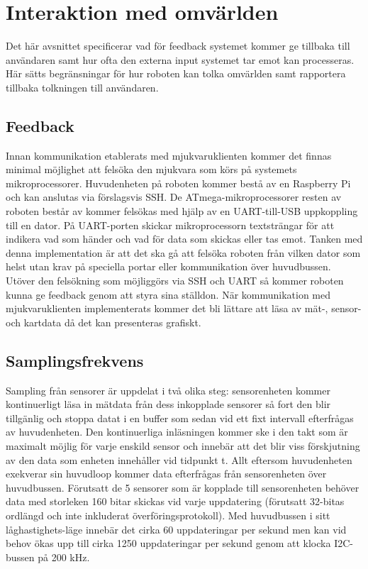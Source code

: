 \documentclass{article}
\begin{document}
\clearpage

\section{Interaktion med omvärlden}
Det här avsnittet specificerar vad för feedback systemet kommer ge tillbaka till användaren samt hur ofta den externa input systemet tar emot kan processeras. Här sätts begränsningar för hur roboten kan tolka omvärlden samt rapportera tillbaka tolkningen till användaren.

\subsection{Feedback}
Innan kommunikation etablerats med mjukvaruklienten kommer det finnas minimal möjlighet att felsöka den mjukvara som körs på systemets mikroprocessorer. Huvudenheten på roboten kommer bestå av en Raspberry Pi och kan anslutas via förslagsvis SSH. De ATmega-mikroprocessorer resten av roboten består av kommer felsökas med hjälp av en UART-till-USB uppkoppling till en dator. På UART-porten skickar mikroprocessorn textsträngar för att indikera vad som händer och vad för data som skickas eller tas emot. Tanken med denna implementation är att det ska gå att felsöka roboten från vilken dator som helst utan krav på speciella portar eller kommunikation över huvudbussen.
\newline\newline
Utöver den felsökning som möjliggörs via SSH och UART så kommer roboten kunna ge feedback genom att styra sina ställdon. När kommunikation med mjukvaruklienten implementerats kommer det bli lättare att läsa av mät-, sensor- och kartdata då det kan presenteras grafiskt.

\subsection{Samplingsfrekvens}
\label{sec:samplingsfrekvens}
Sampling från sensorer är uppdelat i två olika steg: sensorenheten kommer kontinuerligt läsa in mätdata från dess inkopplade sensorer så fort den blir tillgänlig och stoppa datat i en buffer som sedan vid ett fixt intervall efterfrågas av huvudenheten. Den kontinuerliga inläsningen kommer ske i den takt som är maximalt möjlig för varje enskild sensor och innebär att det blir viss förskjutning av den data som enheten innehåller vid tidpunkt t. Allt eftersom huvudenheten exekverar sin huvudloop kommer data efterfrågas från sensorenheten över huvudbussen. Förutsatt de 5 sensorer som är kopplade till sensorenheten behöver data med storleken 160 bitar skickas vid varje uppdatering (förutsatt 32-bitas ordlängd och inte inkluderat överföringsprotokoll). Med huvudbussen i sitt låghastighets-läge innebär det cirka 60 uppdateringar per sekund men kan vid behov ökas upp till cirka 1250 uppdateringar per sekund genom att klocka I2C-bussen på 200 kHz.

\clearpage

\nocite{*}
{}

\end{document}
